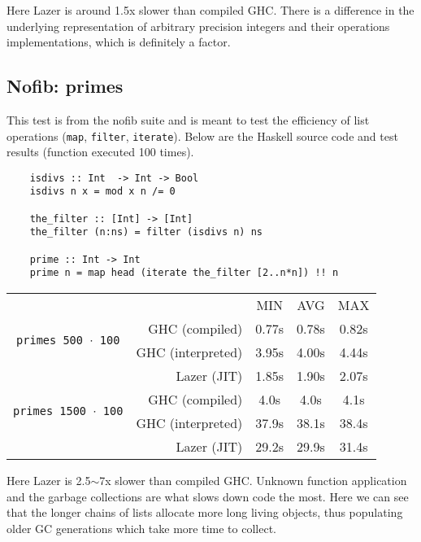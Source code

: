 \documentclass[en]{pracamgr}
\begin{document}
Here Lazer is around 1.5x slower than compiled GHC.
There is a difference in the underlying representation
of arbitrary precision integers and their operations
implementations, which is definitely a factor.

\subsection{Nofib: primes}

This test is from the nofib suite and is meant to test
the efficiency of list operations 
(\texttt{map}, \texttt{filter}, \texttt{iterate}).
Below are the Haskell source code and test results (function executed 100 times).

\begin{verbatim}
    isdivs :: Int  -> Int -> Bool
    isdivs n x = mod x n /= 0
    
    the_filter :: [Int] -> [Int]
    the_filter (n:ns) = filter (isdivs n) ns
    
    prime :: Int -> Int
    prime n = map head (iterate the_filter [2..n*n]) !! n
\end{verbatim}

\begin{center}
\begin{tabular}{c r c c c}
    & & MIN & AVG & MAX \\
    \cline{3-5}

    \multirow{2}{*}{\texttt{primes 500 $\cdot$ 100}}
    & GHC (compiled)& 0.77s & 0.78s & 0.82s \\
    & GHC (interpreted)& 3.95s & 4.00s & 4.44s \\
    & Lazer (JIT)& 1.85s & 1.90s & 2.07s \\
    \cline{2-5}

    \multirow{2}{*}{\texttt{primes 1500 $\cdot$ 100}}
    & GHC (compiled)& 4.0s & 4.0s & 4.1s \\
    & GHC (interpreted)& 37.9s & 38.1s & 38.4s \\
    & Lazer (JIT)& 29.2s & 29.9s & 31.4s \\
\end{tabular}
\end{center}

Here Lazer is 2.5$\sim$7x slower than compiled GHC.
Unknown function application and the garbage collections
are what slows down code the most.
Here we can see that the longer chains of lists
allocate more long living objects, thus populating
older GC generations which take more time to collect.
\end{document}
